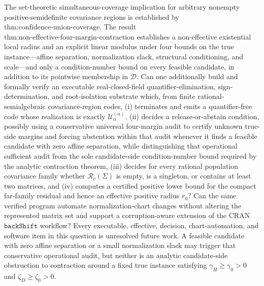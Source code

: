 The set-theoretic simultaneous-coverage implication for arbitrary nonempty positive-semidefinite covariance regions is established by \(\text{thm:confidence-union-coverage}\). The result \(\text{thm:non-effective-four-margin-contraction}\) establishes a non-effective existential local radius and an explicit linear modulus under four bounds on the true instance---affine separation, normalization slack, structural conditioning, and scale---and only a condition-number bound on every feasible candidate, in addition to its pointwise membership in \(\mathcal D\). Can one additionally build and formally verify an executable real-closed-field quantifier-elimination, sign-determination, and root-isolation substrate which, from finite rational-semialgebraic covariance-region codes, (i) terminates and emits a quantifier-free code whose realization is exactly \(\mathcal U^{(n)}_\alpha\), (ii) decides a release-or-abstain condition, possibly using a conservative universal four-margin audit to certify unknown true-side margins and forcing abstention within that audit whenever it finds a feasible candidate with zero affine separation, while distinguishing that operational sufficient audit from the sole candidate-side condition-number bound required by the analytic contraction theorem, (iii) decides for every rational population covariance family whether \(\mathcal R_c(\Sigma)\) is empty, is a singleton, or contains at least two matrices, and (iv) computes a certified positive lower bound for the compact far-family residual and hence an effective positive radius \(r_0\)? Can the same verified program automate normalization-chart changes without altering the represented matrix set and support a corruption-aware extension of the CRAN \(\texttt{backShift}\) workflow? Every executable, effective, decision, chart-automation, and software item in this question is unresolved future work. A feasible candidate with zero affine separation or a small normalization slack may trigger that conservative operational audit, but neither is an analytic candidate-side obstruction to contraction around a fixed true instance satisfying \(\gamma_H\geq\gamma_0>0\) and \(\zeta_D\geq\zeta_0>0\).
